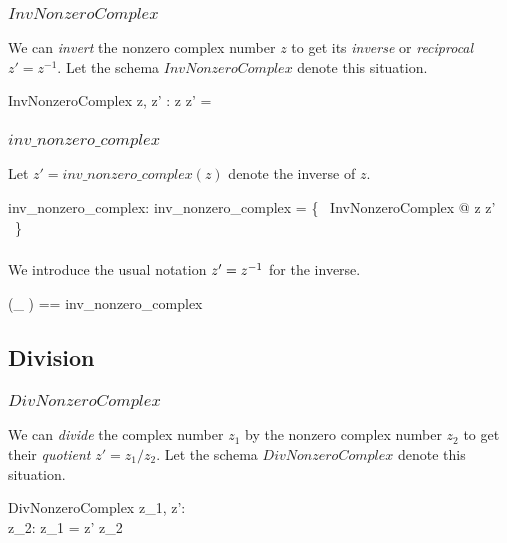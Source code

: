 \documentclass{amsart}
\begin{document}
\subsubsection{$InvNonzeroComplex$}

We can \textit{invert}
the nonzero complex number $z$ to get its \textit{inverse} or \textit{reciprocal} $z' = z^{-1}$.
Let the schema $InvNonzeroComplex$ denote this situation.

\begin{schema}{InvNonzeroComplex}
	z, z' : \Cnz
\where
	z \mulCnz z' = \oneC
\end{schema}

\subsubsection{$inv\_nonzero\_complex$}

Let $z' = inv\_nonzero\_complex(z)$ denote the inverse of $z$.

\begin{axdef}
	inv\_nonzero\_complex: \Cnz \fun \Cnz
\where
	inv\_nonzero\_complex = \{~ InvNonzeroComplex @ z \mapsto z' ~\}
\end{axdef}

\subsubsection{}

We introduce the usual notation $z' = z ^{-1}$ for the inverse.

\begin{zed}
	(\_ \invCnz) == inv\_nonzero\_complex
\end{zed}

\subsection{Division}

\subsubsection{$DivNonzeroComplex$}

We can \textit{divide} the complex number $z_1$ by the nonzero complex number $z_2$ 
to get their \textit{quotient} $z' = z_1 / z_2$.
Let the schema $DivNonzeroComplex$ denote this situation.

\begin{schema}{DivNonzeroComplex}
	z_1, z': \C \\
	z_2: \Cnz
\where
	z_1 = z' \mulCnz z_2
\end{schema}
\end{document}
